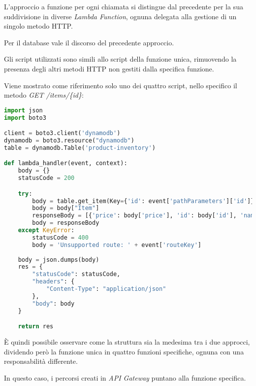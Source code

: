 L'approccio a funzione per ogni chiamata si distingue dal precedente per la sua suddivisione in diverse \textit{Lambda Function}, ognuna delegata alla gestione di un singolo metodo HTTP.

Per il database vale il discorso del precedente approccio.

Gli script utilizzati sono simili allo script della funzione unica, rimuovendo la presenza degli altri metodi HTTP non gestiti dalla specifica funzione.

Viene mostrato come riferimento solo uno dei quattro script, nello specifico il metodo \textit{GET /items/\{id\}}:
\begin{lstlisting}[language=python]
import json
import boto3

client = boto3.client('dynamodb')
dynamodb = boto3.resource("dynamodb")
table = dynamodb.Table('product-inventory')

def lambda_handler(event, context):
    body = {}
    statusCode = 200

    try:
        body = table.get_item(Key={'id': event['pathParameters']['id']})
        body = body["Item"]
        responseBody = [{'price': body['price'], 'id': body['id'], 'name': body['name'], 'description': body['description']}]
        body = responseBody
    except KeyError:
        statusCode = 400
        body = 'Unsupported route: ' + event['routeKey']
    
    body = json.dumps(body)
    res = {
        "statusCode": statusCode,
        "headers": {
            "Content-Type": "application/json"
        },
        "body": body
    }

    return res
\end{lstlisting}

È quindi possibile osservare come la struttura sia la medesima tra i due approcci, dividendo però la funzione unica in quattro funzioni specifiche, ognuna con una responsabilità differente.

In questo caso, i percorsi creati in \textit{API Gateway} puntano alla funzione specifica.